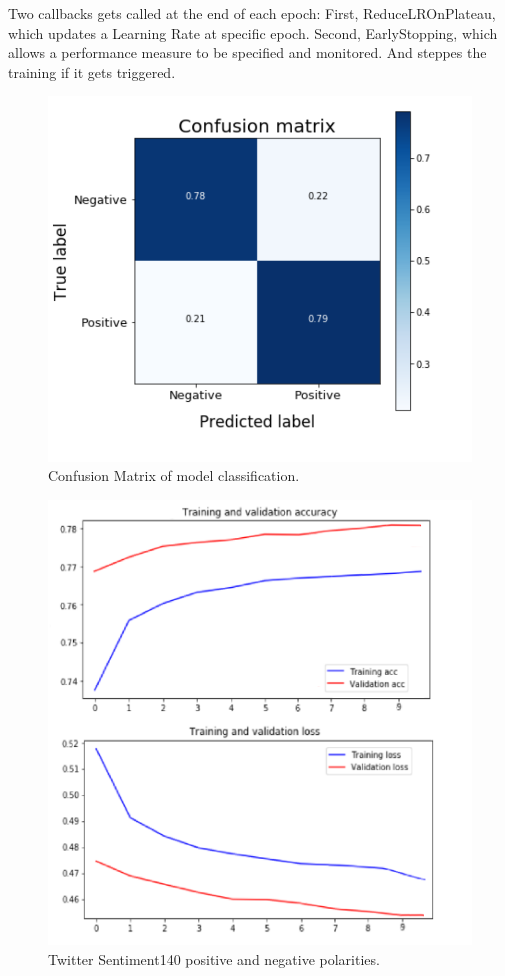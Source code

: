 \documentclass[journal]{IEEEtran}
\begin{document}
\mdskip

Two callbacks gets called at the end of each epoch: First, ReduceLROnPlateau, which updates a Learning Rate at specific epoch. Second, EarlyStopping, which allows a performance measure to be specified and monitored. And steppes the training if it gets triggered.

\begin{figure}[t]
\centering
\includegraphics[width=1\columnwidth]{CMat.png}
\caption{\small Confusion Matrix of model classification.}
    \label{fig:cmat}
\end{figure}


\begin{figure}[t]
\centering
\includegraphics[width=1\columnwidth]{Accuracy Loss.png}
\caption{\small Twitter Sentiment140 positive and negative polarities.}
    \label{fig:accuracyloss}
\end{figure}
\end{document}
